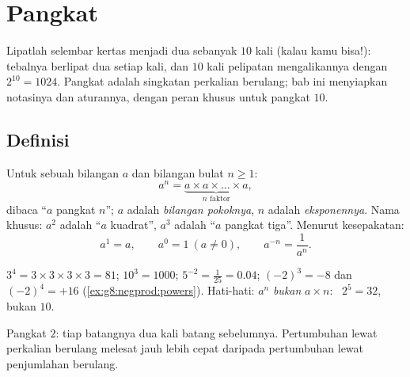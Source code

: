 \chapter{Pangkat}\label{ch:g8:powers}

Lipatlah selembar kertas menjadi dua sebanyak $10$ kali (kalau kamu
bisa!): tebalnya berlipat dua setiap kali, dan $10$ kali pelipatan
mengalikannya dengan $2^{10} = 1024$. Pangkat adalah singkatan
perkalian berulang; bab ini menyiapkan notasinya dan aturannya, dengan
peran khusus untuk pangkat $10$.

\section{Definisi}

\begin{definition}[Pangkat]\label{def:g8:powers:def}
Untuk sebuah bilangan $a$ dan bilangan bulat $n \geq 1$:
\[
a^n = \underbrace{a \times a \times \dots \times a}_{n
\text{ faktor}},
\]
dibaca ``$a$ pangkat $n$''; $a$ adalah \emph{bilangan pokoknya}, $n$
adalah \emph{eksponennya}. Nama khusus: $a^2$ adalah
``$a$ kuadrat'', $a^3$ adalah ``$a$ pangkat tiga''. Menurut kesepakatan:
\[
a^1 = a,
\qquad
a^0 = 1 \ (a \neq 0),
\qquad
a^{-n} = \frac{1}{a^n}.
\]
\end{definition}

\begin{example}\label{ex:g8:powers:def}
$3^4 = 3 \times 3 \times 3 \times 3 = 81$; \quad
$10^3 = 1000$; \quad $5^{-2} = \frac{1}{25} = 0.04$; \quad
$(-2)^3 = -8$ dan $(-2)^4 = +16$
(\cref{ex:g8:negprod:powers}). Hati-hati: $a^n$ \emph{bukan}
$a \times n$: \ $2^5 = 32$, bukan $10$.
\end{example}

\begin{omfigure}

{\small Pangkat $2$: tiap batangnya dua kali batang sebelumnya.
Pertumbuhan lewat perkalian berulang melesat jauh lebih cepat daripada
pertumbuhan lewat penjumlahan berulang.}
\end{omfigure}

